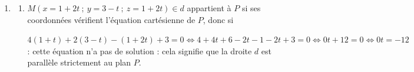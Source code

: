 \begin{enumerate}
%

En remplaçant respectivement dans les équations paramétriques $s$ par 2 et $t$ par 1, on trouve que le point de coordonnées $(-2~;~6~;~1)$ appartient bien aux deux droites.
\item %
	\begin{enumerate}
		\item %
$M(x = 1 + 2t~;~y = 3 - t~;~z = 1 + 2t) \in d$ appartient à $P$ si ses coordonnées vérifient l'équation cartésienne de $P$, donc si 

$4(1 + t) + 2(3 - t) -(1 + 2t) + 3 = 0 \iff 4 + 4t + 6 - 2t - 1 - 2t + 3 = 0 \iff 0t + 12 = 0 \iff 0t = -12$ : cette équation n'a pas de solution : cela signifie que la droite $d$ est parallèle strictement au plan $P$.


\end{enumerate}
\end{enumerate}
